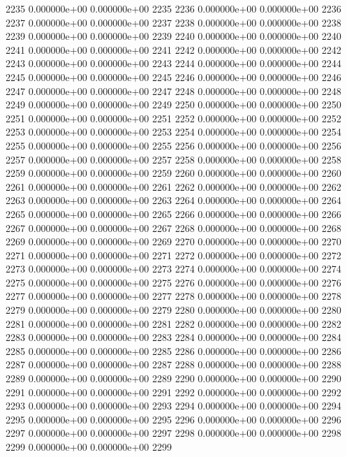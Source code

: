 \documentclass{article}
\begin{document}
\begin{Schunk}
\begin{Soutput}
2235   0.000000e+00   0.000000e+00 2235
2236   0.000000e+00   0.000000e+00 2236
2237   0.000000e+00   0.000000e+00 2237
2238   0.000000e+00   0.000000e+00 2238
2239   0.000000e+00   0.000000e+00 2239
2240   0.000000e+00   0.000000e+00 2240
2241   0.000000e+00   0.000000e+00 2241
2242   0.000000e+00   0.000000e+00 2242
2243   0.000000e+00   0.000000e+00 2243
2244   0.000000e+00   0.000000e+00 2244
2245   0.000000e+00   0.000000e+00 2245
2246   0.000000e+00   0.000000e+00 2246
2247   0.000000e+00   0.000000e+00 2247
2248   0.000000e+00   0.000000e+00 2248
2249   0.000000e+00   0.000000e+00 2249
2250   0.000000e+00   0.000000e+00 2250
2251   0.000000e+00   0.000000e+00 2251
2252   0.000000e+00   0.000000e+00 2252
2253   0.000000e+00   0.000000e+00 2253
2254   0.000000e+00   0.000000e+00 2254
2255   0.000000e+00   0.000000e+00 2255
2256   0.000000e+00   0.000000e+00 2256
2257   0.000000e+00   0.000000e+00 2257
2258   0.000000e+00   0.000000e+00 2258
2259   0.000000e+00   0.000000e+00 2259
2260   0.000000e+00   0.000000e+00 2260
2261   0.000000e+00   0.000000e+00 2261
2262   0.000000e+00   0.000000e+00 2262
2263   0.000000e+00   0.000000e+00 2263
2264   0.000000e+00   0.000000e+00 2264
2265   0.000000e+00   0.000000e+00 2265
2266   0.000000e+00   0.000000e+00 2266
2267   0.000000e+00   0.000000e+00 2267
2268   0.000000e+00   0.000000e+00 2268
2269   0.000000e+00   0.000000e+00 2269
2270   0.000000e+00   0.000000e+00 2270
2271   0.000000e+00   0.000000e+00 2271
2272   0.000000e+00   0.000000e+00 2272
2273   0.000000e+00   0.000000e+00 2273
2274   0.000000e+00   0.000000e+00 2274
2275   0.000000e+00   0.000000e+00 2275
2276   0.000000e+00   0.000000e+00 2276
2277   0.000000e+00   0.000000e+00 2277
2278   0.000000e+00   0.000000e+00 2278
2279   0.000000e+00   0.000000e+00 2279
2280   0.000000e+00   0.000000e+00 2280
2281   0.000000e+00   0.000000e+00 2281
2282   0.000000e+00   0.000000e+00 2282
2283   0.000000e+00   0.000000e+00 2283
2284   0.000000e+00   0.000000e+00 2284
2285   0.000000e+00   0.000000e+00 2285
2286   0.000000e+00   0.000000e+00 2286
2287   0.000000e+00   0.000000e+00 2287
2288   0.000000e+00   0.000000e+00 2288
2289   0.000000e+00   0.000000e+00 2289
2290   0.000000e+00   0.000000e+00 2290
2291   0.000000e+00   0.000000e+00 2291
2292   0.000000e+00   0.000000e+00 2292
2293   0.000000e+00   0.000000e+00 2293
2294   0.000000e+00   0.000000e+00 2294
2295   0.000000e+00   0.000000e+00 2295
2296   0.000000e+00   0.000000e+00 2296
2297   0.000000e+00   0.000000e+00 2297
2298   0.000000e+00   0.000000e+00 2298
2299   0.000000e+00   0.000000e+00 2299

\end{Soutput}
\end{Schunk}
\end{document}
